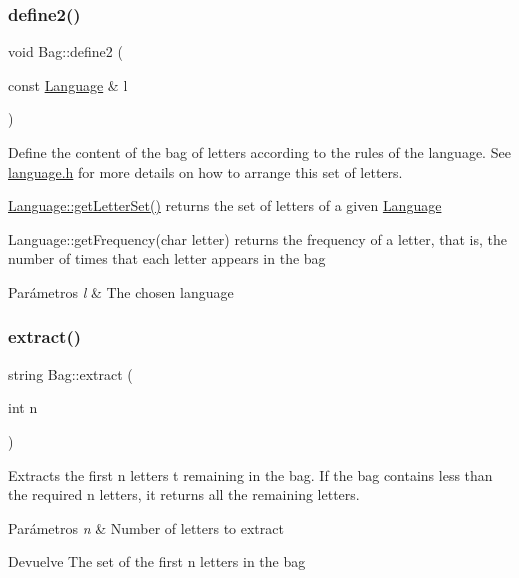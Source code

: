 \subsubsection{\texorpdfstring{define2()}{define2()}}
{\footnotesize\ttfamily void Bag\+::define2 (\begin{DoxyParamCaption}\item[{const \hyperlink{classLanguage}{Language} \&}]{l }\end{DoxyParamCaption})}



Define the content of the bag of letters according to the rules of the language. See \hyperlink{language_8h}{language.\+h} for more details on how to arrange this set of letters. 


\begin{DoxyItemize}
\item \hyperlink{classLanguage_ad72e0fe4a285a849d217a1b9251c79f1}{Language\+::get\+Letter\+Set()} returns the set of letters of a given \hyperlink{classLanguage}{Language}
\item Language\+::get\+Frequency(char letter) returns the frequency of a letter, that is, the number of times that each letter appears in the bag 
\begin{DoxyParams}{Parámetros}
{\em l} & The chosen language \\
\hline
\end{DoxyParams}

\end{DoxyItemize}\mbox{\label{classBag_ac75abe2b7626e50109a1add3382978af}} 
\subsubsection{\texorpdfstring{extract()}{extract()}}
{\footnotesize\ttfamily string Bag\+::extract (\begin{DoxyParamCaption}\item[{int}]{n }\end{DoxyParamCaption})}



Extracts the first {\ttfamily n} letters t remaining in the bag. If the bag contains less than the required {\ttfamily n} letters, it returns all the remaining letters. 


\begin{DoxyParams}{Parámetros}
{\em n} & Number of letters to extract \\
\hline
\end{DoxyParams}
\begin{DoxyReturn}{Devuelve}
The set of the first {\ttfamily n} letters in the bag 
\end{DoxyReturn}


